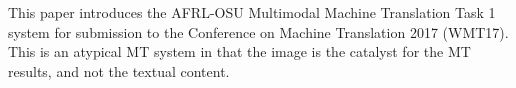 This paper introduces the AFRL-OSU Multimodal Machine Translation Task 1 system for submission to the Conference on Machine Translation 2017 (WMT17). This is an atypical MT system in that the image is the catalyst for the MT results, and not the textual content.
